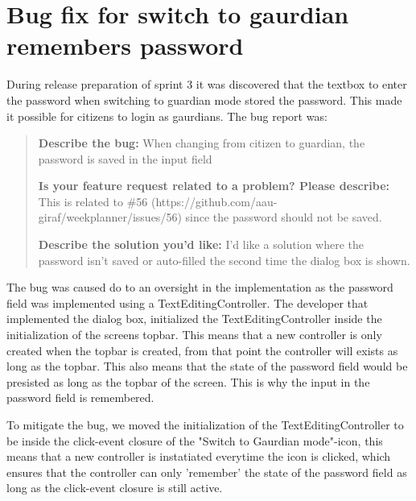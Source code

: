 \section{Bug fix for switch to gaurdian remembers password}
During release preparation of sprint 3 it was discovered that the textbox to enter the password when switching to guardian mode stored the password. This made it possible for citizens to login as gaurdians. The bug report was:

\begin{quote}
  \textbf{Describe the bug:} When changing from citizen to guardian, the password is saved in the input field

  \textbf{Is your feature request related to a problem? Please describe:} This is related to \#56 (https://github.com/aau-giraf/weekplanner/issues/56) since the password should not be saved.

  \textbf{Describe the solution you'd like: } I'd like a solution where the password isn't saved or auto-filled the second time the dialog box is shown.
\end{quote}

The bug was caused do to an oversight in the implementation as the password field was implemented using a TextEditingController. The developer that implemented the dialog box, initialized the TextEditingController inside the initialization of the screens topbar. This means that a new controller is only created when the topbar is created, from that point the controller will exists as long as the topbar. This also means that the state of the password field would be presisted as long as the topbar of the screen. This is why the input in the password field is remembered.

To mitigate the bug, we moved the initialization of the TextEditingController to be inside the click-event closure of the "Switch to Gaurdian mode"-icon, this means that a new controller is instatiated everytime the icon is clicked, which ensures that the controller can only 'remember' the state of the password field as long as the click-event closure is still active.
